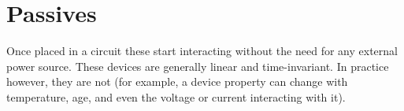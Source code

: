 \section{Passives}

Once placed in a circuit these start interacting without the need
for any external power source. These devices are generally linear
and time-invariant. In practice however, they are not (for example,
a device property can change with temperature, age, and even the
voltage or current interacting with it).





